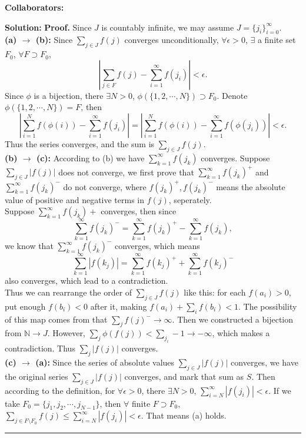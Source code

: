 \documentclass{article}%
\newenvironment{proof}[1][Proof]{\textbf{#1.} }{\ \rule{0.5em}{0.5em}}
\begin{document}
\begin{enumerate}
\bigskip
\textbf{Collaborators:}\\
\smallskip
 
\textbf{Solution:}
\begin{proof}
Since $J$ is countably infinite, we may assume $J = \{j_i\}_{i=0}^{\infty}$. \\[2pt]
\textbf{(a) $\to$ (b):}
Since $\sum_{j\in J}f(j)$ converges unconditionally, $\forall \epsilon > 0$, $\exists$ a finite set $F_0$, $\forall F\supset F_0$,
$$
\left|\sum_{j\in F}f(j)-\sum_{i=1}^{\infty}f(j_i)\right|<\epsilon.
$$
Since $\phi$ is a bijection, there $\exists N > 0$, $\phi(\{1, 2, \cdots, N\})\supset F_0$. Denote $\phi(\{1, 2, \cdots, N\}) = F$, then
$$
\left|\sum_{i=1}^{N}f(\phi(i))-\sum_{i=1}^{\infty}f(j_i)\right| = \left|\sum_{i=1}^{N}f(\phi(i))-\sum_{i=1}^{\infty}f(\phi(j_i))\right| < \epsilon.
$$
Thus the series converges, and the sum is $\sum_{j\in J}f(j)$. \\[2pt]
\textbf{(b) $\to$ (c):}
According to (b) we have $\sum_{k=1}^{\infty}f(j_k)$ converges. Suppose $\sum_{j\in J}|f(j)|$ does not converge, we first prove that $\sum_{k=1}^{\infty}f(j_k)^+$ and $\sum_{k=1}^{\infty}f(j_k)^-$ do not converge, where $f(j_k)^+, f(j_k)^-$ means the absolute value of positive and negative terms in $f(j)$, seperately. \\[2pt]
Suppose $\sum_{k=1}^{\infty}f(j_k)+$ converges, then since
$$
\sum_{k=1}^{\infty}f(j_k)^- = \sum_{k=1}^{\infty}f(j_k)^+-\sum_{k=1}^{\infty}f(j_k),
$$
we know that $\sum_{k=1}^{\infty}f(j_k)^-$ converges, which means
$$
\sum_{k=1}^{\infty}|f(k_j)| = \sum_{k=1}^{\infty}f(k_j)^++\sum_{k=1}^{\infty}f(k_j)^-
$$
also converges, which lead to a contradiction. \\[2pt]
Thus we can rearrange the order of $\sum_{j\in J}f(j)$ like this: for each $f(a_i) > 0$, put enough $f(b_i) < 0$ after it, making $f(a_i) + \sum_{i}f(b_i) < 1$. The possibility of this map comes from that $\sum_{j}f(j)^-\to\infty$. Then we constructed a bijection from $\mathbb{N}\to J$. However, $\sum_{j}\phi(f(j)) < \sum_{j_i}-1\to -\infty$, which makes a contradiction. Thus $\sum_{j}|f(j)|$ converges. \\[2pt]
\textbf{(c) $\to$ (a):} Since the series of absolute values $\sum_{j\in J}|f(j)|$ converges, we have the original series $\sum_{j\in J}|f(j)|$ converges, and mark that sum as $S$. Then according to the definition, for $\forall \epsilon > 0$, there $\exists N > 0$, $\sum_{i=N}^{\infty}|f(j_i)| < \epsilon$. If we take $F_0 = \{j_1, j_2, \cdots, j_{N-1}\}$, then $\forall$ finite $F\supset F_0$, $\sum_{j\in F\setminus F_0} f(j) \le \sum_{i=N}^{\infty}|f(j_i)|< \epsilon$. That means (a) holds.
\end{proof}
\bigskip




\end{enumerate}
\end{document}
